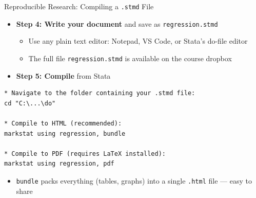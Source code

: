 \documentclass[dvipsnames,hyperref={pdfpagelabels=false}]{beamer}
\begin{document}
\begin{frame}[fragile]{Reproducible Research: Compiling a \texttt{.stmd} File}

	\begin{itemize}
		\item \textbf{Step 4: Write your document} and save as \texttt{regression.stmd}
		\vspace{0.2cm}
		\begin{itemize}
			\item Use any plain text editor: Notepad, VS Code, or Stata's do-file editor
			\vspace{0.1cm}
			\item The full file \texttt{regression.stmd} is available on the course dropbox
		\end{itemize}
		\vspace{0.3cm}
		\item \textbf{Step 5: Compile} from Stata
	\end{itemize}

\begin{lstlisting}
* Navigate to the folder containing your .stmd file:
cd "C:\...\do"

* Compile to HTML (recommended):
markstat using regression, bundle

* Compile to PDF (requires LaTeX installed):
markstat using regression, pdf
\end{lstlisting}

	\begin{itemize}
		\item \texttt{bundle} packs everything (tables, graphs) into a single \texttt{.html} file --- easy to share
	\end{itemize}

\end{frame}
\end{document}
